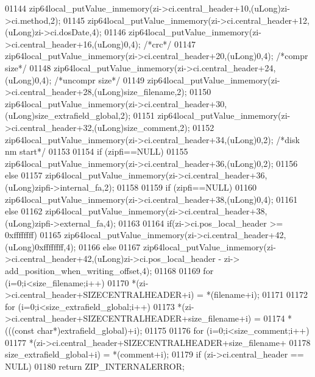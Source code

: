 \begin{DoxyCode}
01144     zip64local\_putValue\_inmemory(zi->ci.central\_header+10,(uLong)zi->ci.method,2);
01145     zip64local\_putValue\_inmemory(zi->ci.central\_header+12,(uLong)zi->ci.dosDate,4);
01146     zip64local\_putValue\_inmemory(zi->ci.central\_header+16,(uLong)0,4); \textcolor{comment}{/*crc*/}
01147     zip64local\_putValue\_inmemory(zi->ci.central\_header+20,(uLong)0,4); \textcolor{comment}{/*compr size*/}
01148     zip64local\_putValue\_inmemory(zi->ci.central\_header+24,(uLong)0,4); \textcolor{comment}{/*uncompr size*/}
01149     zip64local\_putValue\_inmemory(zi->ci.central\_header+28,(uLong)size\_filename,2);
01150     zip64local\_putValue\_inmemory(zi->ci.central\_header+30,(uLong)size\_extrafield\_global,2);
01151     zip64local\_putValue\_inmemory(zi->ci.central\_header+32,(uLong)size\_comment,2);
01152     zip64local\_putValue\_inmemory(zi->ci.central\_header+34,(uLong)0,2); \textcolor{comment}{/*disk nm start*/}
01153 
01154     \textcolor{keywordflow}{if} (zipfi==NULL)
01155         zip64local\_putValue\_inmemory(zi->ci.central\_header+36,(uLong)0,2);
01156     \textcolor{keywordflow}{else}
01157         zip64local\_putValue\_inmemory(zi->ci.central\_header+36,(uLong)zipfi->internal\_fa,2);
01158 
01159     \textcolor{keywordflow}{if} (zipfi==NULL)
01160         zip64local\_putValue\_inmemory(zi->ci.central\_header+38,(uLong)0,4);
01161     \textcolor{keywordflow}{else}
01162         zip64local\_putValue\_inmemory(zi->ci.central\_header+38,(uLong)zipfi->external\_fa,4);
01163 
01164     \textcolor{keywordflow}{if}(zi->ci.pos\_local\_header >= 0xffffffff)
01165       zip64local\_putValue\_inmemory(zi->ci.central\_header+42,(uLong)0xffffffff,4);
01166     \textcolor{keywordflow}{else}
01167       zip64local\_putValue\_inmemory(zi->ci.central\_header+42,(uLong)zi->ci.pos\_local\_header - zi->
      add\_position\_when\_writing\_offset,4);
01168 
01169     \textcolor{keywordflow}{for} (i=0;i<size\_filename;i++)
01170         *(zi->ci.central\_header+SIZECENTRALHEADER+i) = *(filename+i);
01171 
01172     \textcolor{keywordflow}{for} (i=0;i<size\_extrafield\_global;i++)
01173         *(zi->ci.central\_header+SIZECENTRALHEADER+size\_filename+i) =
01174               *(((\textcolor{keyword}{const} \textcolor{keywordtype}{char}*)extrafield\_global)+i);
01175 
01176     \textcolor{keywordflow}{for} (i=0;i<size\_comment;i++)
01177         *(zi->ci.central\_header+SIZECENTRALHEADER+size\_filename+
01178               size\_extrafield\_global+i) = *(comment+i);
01179     \textcolor{keywordflow}{if} (zi->ci.central\_header == NULL)
01180         \textcolor{keywordflow}{return} ZIP\_INTERNALERROR;

\end{DoxyCode}
